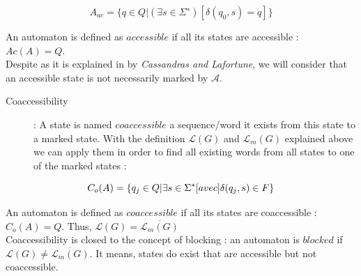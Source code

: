 \begin{equation*}
A_{ac} = \{q \in Q | (\exists s \in \Sigma^∗) [\delta(q_0, s) = q]\}
\end{equation*}

\vspace{0.5cm}

An automaton is defined as $accessible$ if all its states are accessible : $Ac(A)=Q$.\\
Despite as it is explained in \cite{cassandras2009introduction} by \textit{Cassandras and Lafortune}, we will consider that an accessible state  is not necessarily marked by $\mathcal{A}$.

\begin{description}
\item [Coaccessibility] : A state is named $coaccessible$ a sequence/word it exists from this state to a marked state. With the definition $\mathcal{L}(G)$ and $\mathcal{L}_m(G)$ explained above we can apply them in order to find all existing words from all states to one of the marked states :
\end{description}

\begin{equation*}
C_o(A) = \{q_j \in Q| \exists s \in \Sigma^* \text[avec] \delta(q_j, s) \in F\}
\end{equation*}
 \vspace{0.5cm}
 
An automaton is defined as $coaccessible$ if all its states are coaccessible : $C_o(A)=Q$. Thus, $\mathcal{L}(G) = \overline{\mathcal{L}_m(G)}$\\
Coaccessibility is closed to the concept of blocking : an automaton is $blocked$ if $\mathcal{L}(G) \neq \overline{\mathcal{L}_m(G)}$. It means, states do exist that are accessible but not coaccessible.

